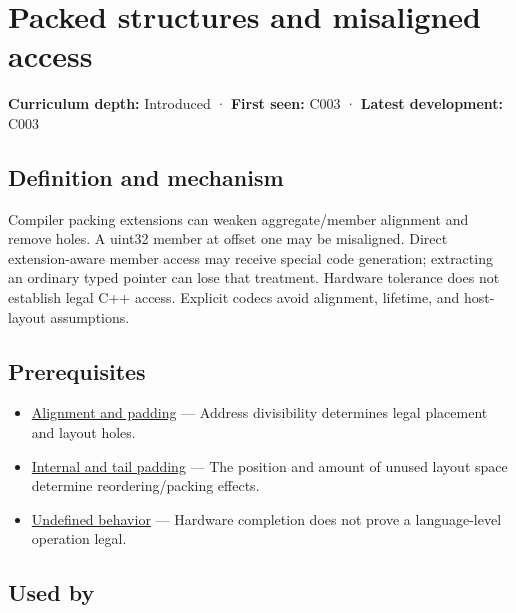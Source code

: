 \hypertarget{appendix-0682dbfc5f0e}{}\label{referencestart:appendix-0682dbfc5f0e}
\section{Packed structures and misaligned access}\label{appendix-0682dbfc5f0e-packed-structures-and-misaligned-access}

\textbf{Curriculum depth:} Introduced · \textbf{First seen:} C003 · \textbf{Latest development:} C003

\begin{allmightroledefinition}

\subsection{Definition and mechanism}\label{appendix-0682dbfc5f0e-definition-and-mechanism}

Compiler packing extensions can weaken aggregate/member alignment and remove holes. A uint32 member at offset one may be misaligned. Direct extension-aware member access may receive special code generation; extracting an ordinary typed pointer can lose that treatment. Hardware tolerance does not establish legal C++ access. Explicit codecs avoid alignment, lifetime, and host-layout assumptions.

\end{allmightroledefinition}

\subsection{Prerequisites}\label{appendix-0682dbfc5f0e-prerequisites}

\begin{itemize}
\tightlist
\item
  \hyperref[appendix-a1f7c53b4742]{Alignment and padding} --- Address divisibility determines legal placement and layout holes.
\item
  \hyperref[appendix-f52f8c5a3afd]{Internal and tail padding} --- The position and amount of unused layout space determine reordering/packing effects.
\item
  \hyperref[appendix-f558f5b4d8f2]{Undefined behavior} --- Hardware completion does not prove a language-level operation legal.
\end{itemize}

\subsection{Used by}\label{appendix-0682dbfc5f0e-used-by}

